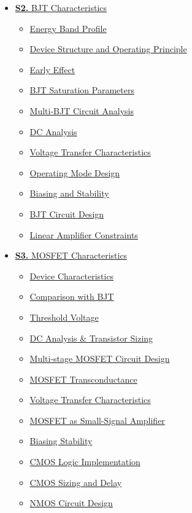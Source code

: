 \documentclass[12pt,a4paper]{article}
\begin{document}
\begin{tcolorbox}[breakable,colback=cA!5,colframe=cA,boxrule=1pt,arc=5pt,
  left=8pt,right=8pt,top=8pt,bottom=8pt,before skip=4pt]
\begin{itemize}[leftmargin=1.2em,itemsep=1pt,label={\textcolor{cA}{$\triangleright$}}]
    \item \hyperref[sec:S2]{\textbf{S2.} BJT Characteristics}
      \begin{itemize}[leftmargin=1.5em,itemsep=0pt,label={\textcolor{cA}{$\cdot$}}]
        \item \hyperref[sub:s2-energy]{Energy Band Profile}
        \item \hyperref[sub:s2-structure]{Device Structure and Operating Principle}
        \item \hyperref[sub:s2-early]{Early Effect}
        \item \hyperref[sub:s2-saturation]{BJT Saturation Parameters}
        \item \hyperref[sub:s2-multibjtdc]{Multi-BJT Circuit Analysis}
        \item \hyperref[sub:s2-dc]{DC Analysis}
        \item \hyperref[sub:s2-vtc]{Voltage Transfer Characteristics}
        \item \hyperref[sub:s2-opmode]{Operating Mode Design}
        \item \hyperref[sub:s2-biasing]{Biasing and Stability}
        \item \hyperref[sub:s2-design]{BJT Circuit Design}
        \item \hyperref[sub:s2-linear]{Linear Amplifier Constraints}
      \end{itemize}
    \item \hyperref[sec:S3]{\textbf{S3.} MOSFET Characteristics}
      \begin{itemize}[leftmargin=1.5em,itemsep=0pt,label={\textcolor{cA}{$\cdot$}}]
        \item \hyperref[sub:s3-devchar]{Device Characteristics}
        \item \hyperref[sub:s3-compare]{Comparison with BJT}
        \item \hyperref[sub:s3-threshold]{Threshold Voltage}
        \item \hyperref[sub:s3-dc]{DC Analysis \& Transistor Sizing}
        \item \hyperref[sub:s3-multistage]{Multi-stage MOSFET Circuit Design}
        \item \hyperref[sub:s3-gm]{MOSFET Transconductance}
        \item \hyperref[sub:s3-vtc]{Voltage Transfer Characteristics}
        \item \hyperref[sub:s3-ssa]{MOSFET as Small-Signal Amplifier}
        \item \hyperref[sub:s3-biasing]{Biasing Stability}
        \item \hyperref[sub:s3-cmos]{CMOS Logic Implementation}
        \item \hyperref[sub:s3-sizing]{CMOS Sizing and Delay}
        \item \hyperref[sub:s3-nmos]{NMOS Circuit Design}
      \end{itemize}
  \end{itemize}
\end{tcolorbox}
\end{document}

